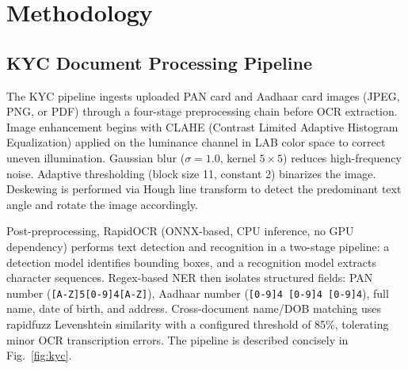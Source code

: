 \documentclass[conference]{IEEEtran}
\begin{document}
\section{Methodology}
\label{sec:methodology}

\subsection{KYC Document Processing Pipeline}

The KYC pipeline ingests uploaded PAN card and Aadhaar
card images (JPEG, PNG, or PDF) through a four-stage
preprocessing chain before OCR extraction. Image
enhancement begins with CLAHE (Contrast Limited
Adaptive Histogram Equalization) applied on the
luminance channel in LAB color space to correct uneven
illumination. Gaussian blur ($\sigma = 1.0$, kernel
$5 \times 5$) reduces high-frequency noise. Adaptive
thresholding (block size 11, constant 2) binarizes the
image. Deskewing is performed via Hough line transform
to detect the predominant text angle and rotate the
image accordingly.

Post-preprocessing, RapidOCR (ONNX-based, CPU inference,
no GPU dependency) performs text detection and
recognition in a two-stage pipeline: a detection model
identifies bounding boxes, and a recognition model
extracts character sequences. Regex-based NER then
isolates structured fields: PAN number
(\texttt{[A-Z]{5}[0-9]{4}[A-Z]}), Aadhaar number
(\texttt{[0-9]{4} [0-9]{4} [0-9]{4}}), full name,
date of birth, and address. Cross-document name/DOB
matching uses rapidfuzz Levenshtein similarity with a
configured threshold of 85\%, tolerating minor OCR
transcription errors. The pipeline is described concisely
in Fig.~\ref{fig:kyc}.
\end{document}
